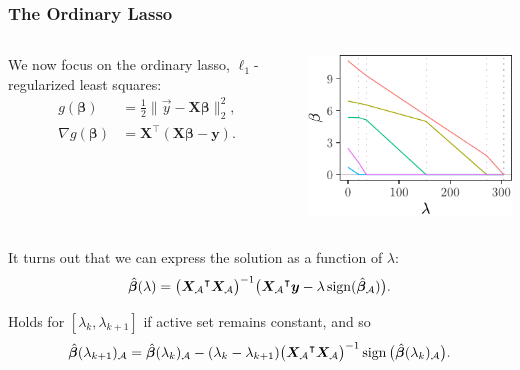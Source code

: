 \documentclass[10pt]{beamer}
\begin{document}
\begin{frame}
  \frametitle{The Ordinary Lasso}
  \begin{columns}
    \begin{column}{0.45\textwidth}
      We now focus on the ordinary lasso, \(\ell_1\)-regularized least
      squares:
      \begin{align*}
        g(\bm{\beta})        & = \frac 1 2 \lVert \vec{y} - \bm{X \beta} \rVert_2^2, \\
        \nabla g(\bm{\beta}) & = \bm{X}^\intercal(\bm{X\beta} - \bm{y}).
      \end{align*}
    \end{column}
    \begin{column}{0.45\textwidth}
      \centering
      \includegraphics[width=\textwidth]{figures/paper3-lasso-path.pdf}
    \end{column}
  \end{columns}

  \bigskip

  \pause

  It turns out that we can express the solution as a function of \(\lambda\):
  \begin{equation*}
    \hat{\bm{\beta}}(\lambda) = \big({\bm{X}_\mathcal{A}}^\intercal \bm{X}_\mathcal{A}\big)^{-1}
    \big({\bm{X}_\mathcal{A}}^\intercal \bm{y} - \lambda \operatorname{sign}(\hat{\bm{\beta}}_\mathcal{A})\big).
  \end{equation*}

  Holds for \([\lambda_k,\lambda_{k+1}]\) if active set remains constant, and so
  \begin{equation*}
    \hat{\bm{\beta}}(\lambda_{k+1})_\mathcal{A} =
    \hat{\bm{\beta}}(\lambda_k)_\mathcal{A} -
    (\lambda_k - \lambda_{k+1})\big({\bm{X}_\mathcal{A}}^\intercal \bm{X}_\mathcal{A}\big)^{-1}
    \operatorname{sign}\big(\hat{\bm{\beta}}(\lambda_k)_\mathcal{A}\big).
  \end{equation*}

\end{frame}
\end{document}
